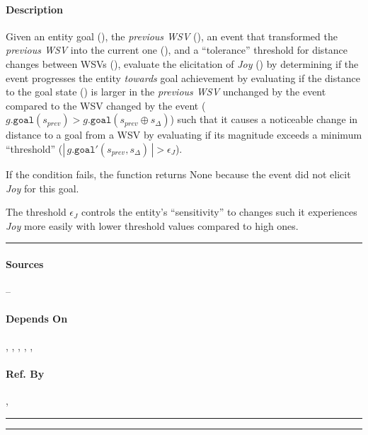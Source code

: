 \paragraph{Description} Given an entity goal (), the
\textit{previous WSV} (), an event that transformed the
\textit{previous WSV} into the current one (), and a
``tolerance'' threshold for distance changes between WSVs
(), evaluate the elicitation of
\textit{Joy} () by determining if the event
progresses the entity \textit{towards} goal achievement by evaluating if the
distance to the goal state () is larger in
the \textit{previous WSV} unchanged by the event compared to the WSV changed by
the event ($g.\mathtt{goal}(s_{prev}) > g.\mathtt{goal}(s_{prev} \oplus
s_\Delta)$) such that it causes a noticeable change in distance to a goal from
a WSV by evaluating if its magnitude exceeds a minimum ``threshold''
($| \, g.\mathtt{goal'}(s_{prev}, s_\Delta) \, | > \epsilon_{J}$).

If the condition fails, the function returns None because the event did not
elicit \textit{Joy} for this goal.

The threshold $\epsilon_{J}$ controls the entity's ``sensitivity'' to changes
such it experiences \textit{Joy} more easily with lower threshold values
compared to high ones. \\\hrule

\paragraph{Sources} --

\paragraph{Depends On} , ,
, ,
, 

\paragraph{Ref. By} ,
 \\\hrule\vspace{0.5mm}\hrule

